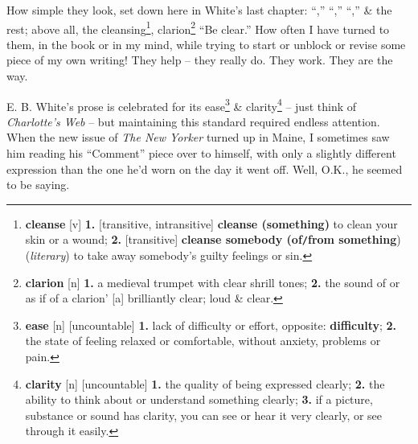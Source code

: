 \documentclass{article}
\begin{document}
How simple they look, set down here in White's last chapter: ``,'' ``,'' ``,'' \& the rest; above all, the cleansing\footnote{{\bf cleanse} [v] {\bf 1.} [transitive, intransitive] {\bf cleanse (something)} to clean your skin or a wound; {\bf 2.} [transitive] {\bf cleanse somebody (of{\tt/}from something}) ({\it literary}) to take away somebody's guilty feelings or sin.}, clarion\footnote{{\bf clarion} [n] {\bf 1.} a medieval trumpet with clear shrill tones; {\bf 2.} the sound of or as if of a clarion' [a] brilliantly clear; loud \& clear.} ``Be clear.'' How often I have turned to them, in the book or in my mind, while trying to start or unblock or revise some piece of my own writing! They help -- they really do. They work. They are the way.

E. B. White's prose is celebrated for its ease\footnote{{\bf ease} [n] [uncountable] {\bf 1.} lack of difficulty or effort, {\sc opposite}: {\bf difficulty}; {\bf 2.} the state of feeling relaxed or comfortable, without anxiety, problems or pain.} \& clarity\footnote{{\bf clarity} [n] [uncountable] {\bf 1.} the quality of being expressed clearly; {\bf 2.} the ability to think about or understand something clearly; {\bf 3.} if a picture, substance or sound has clarity, you can see or hear it very clearly, or see through it easily.} -- just think of {\it Charlotte's Web} -- but maintaining this standard required endless attention. When the new issue of {\it The New Yorker} turned up in Maine, I sometimes saw him reading his ``Comment'' piece over to himself, with only a slightly different expression than the one he'd worn on the day it went off. Well, O.K., he seemed to be saying. 
\end{document}
